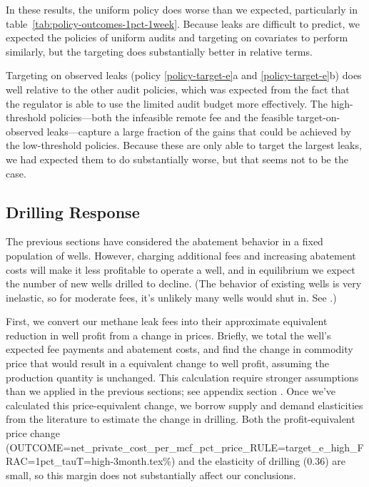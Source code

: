 \documentclass[12pt,oneside,letterpaper]{article}
\theoremstyle{definition}
\begin{document}
\begin{refsection}
In these results, the uniform policy does worse than we expected, particularly in
table~\ref{tab:policy-outcomes-1pct-1week}.
Because leaks are difficult to predict, we expected the policies of uniform audits and targeting on covariates to perform similarly, but the targeting does substantially better in relative terms.

Targeting on observed leaks (policy \ref{policy-target-e}a and \ref{policy-target-e}b) does well relative to the other audit policies, which was expected from the fact that the regulator is able to use the limited audit budget more effectively.
The high-threshold policies---both the infeasible remote fee and the feasible target-on-observed leaks---capture a large fraction of the gains that could be achieved by the low-threshold policies.
Because these are only able to target the largest leaks, we had expected them to do substantially worse, but that seems not to be the case.

\subsection{Drilling Response}
\label{sec:drilling-response}
The previous sections have considered the abatement behavior in a fixed population of wells.
However, charging additional fees and increasing abatement costs will make it less profitable to operate a well, and in equilibrium we expect the number of new wells drilled to decline.
(The behavior of existing wells is very inelastic, so for moderate fees, it's unlikely many wells would shut in.
See \cite{Anderson/Kellogg/Salant:2018}.)

First, we convert our methane leak fees into their approximate equivalent reduction in well profit from a change in prices.
Briefly, we total the well's expected fee payments and abatement costs, and find the change in commodity price that would result in a equivalent change to well profit, assuming the production quantity is unchanged.
This calculation require stronger assumptions than we applied in the previous sections; see appendix section .
Once we've calculated this price-equivalent change, we borrow supply and demand elasticities from the literature to estimate the change in drilling.
Both the profit-equivalent price change
({OUTCOME=net_private_cost_per_mcf_pct_price_RULE=target_e_high_FRAC=1pct_tauT=high-3month.tex}\%)
and the elasticity of drilling (0.36) are small, so this margin does not substantially affect our conclusions.



\end{refsection}
\end{document}
